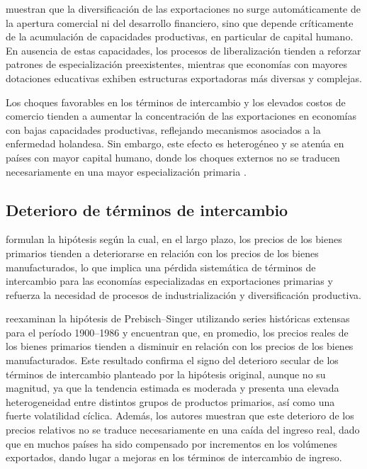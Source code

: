 \documentclass[../../TFM.tex]{subfiles}
\begin{document}
	\textcite{Agosin2012} muestran que la diversificación de las exportaciones no surge automáticamente de la apertura comercial ni del desarrollo financiero, sino que depende críticamente de la acumulación de capacidades productivas, en particular de capital humano. En ausencia de estas capacidades, los procesos de liberalización tienden a reforzar patrones de especialización preexistentes, mientras que economías con mayores dotaciones educativas exhiben estructuras exportadoras más diversas y complejas.
	
	Los choques favorables en los términos de intercambio y los elevados costos de comercio tienden a aumentar la concentración de las exportaciones en economías con bajas capacidades productivas, reflejando mecanismos asociados a la enfermedad holandesa. Sin embargo, este efecto es heterogéneo y se atenúa en países con mayor capital humano, donde los choques externos no se traducen necesariamente en una mayor especialización primaria \parencite{Agosin2012}.
	
	\subsection{Deterioro de términos de intercambio}
	\label{subsec:deterioro-terminos-intercambio}
	
	\textcite{Prebisch1962,Singer1975} formulan la hipótesis según la cual, en el largo plazo, los precios de los bienes primarios tienden a deteriorarse en relación con los precios de los bienes manufacturados, lo que implica una pérdida sistemática de términos de intercambio para las economías especializadas en exportaciones primarias y refuerza la necesidad de procesos de industrialización y diversificación productiva.
	
	\textcite{Grilli1988} reexaminan la hipótesis de Prebisch--Singer utilizando series históricas extensas para el período 1900--1986 y encuentran que, en promedio, los precios reales de los bienes primarios tienden a disminuir en relación con los precios de los bienes manufacturados. Este resultado confirma el signo del deterioro secular de los términos de intercambio planteado por la hipótesis original, aunque no su magnitud, ya que la tendencia estimada es moderada y presenta una elevada heterogeneidad entre distintos grupos de productos primarios, así como una fuerte volatilidad cíclica. Además, los autores muestran que este deterioro de los precios relativos no se traduce necesariamente en una caída del ingreso real, dado que en muchos países ha sido compensado por incrementos en los volúmenes exportados, dando lugar a mejoras en los términos de intercambio de ingreso.
	
\end{document}
